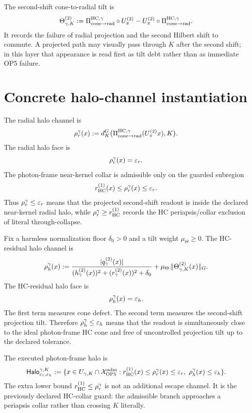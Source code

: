 \begin{definition}
The second-shift cone-to-radial tilt is
\[
\Theta_{\gamma,K}^{(2)}
:=
\Pi_{\mathrm{cone}\to\mathrm{rad}}^{\mathrm{HC},\gamma}\circ U_{\pi}^{(2)}-U_{\pi}^{(2)}\circ\Pi_{\mathrm{cone}\to\mathrm{rad}}^{\mathrm{HC},\gamma}.
\]
It records the failure of radial projection and the second Hilbert shift to commute. A projected path may visually pass through \(K\) after the second shift; in this layer that appearance is read first as tilt debt rather than as immediate OP5 failure.
\end{definition}

\section{Concrete halo-channel instantiation}

\begin{definition}
The radial halo channel is
\[
\rho_{r}^{\gamma}(x)
:=
 d_K^G\bigl(\Pi_{\mathrm{cone}\to\mathrm{rad}}^{\mathrm{HC},\gamma}(U_{\pi}^{(2)} x),K\bigr).
\]
The radial halo face is
\[
\rho_{r}^{\gamma}(x)=\varepsilon_r.
\]
The photon-frame near-kernel collar is admissible only on the guarded subregion
\[
r_{\mathrm{HC}}^{(1)}(x)\le \rho_{r}^{\gamma}(x)\le \varepsilon_r.
\]
Thus \(\rho_{r}^{\gamma}\le \varepsilon_r\) means that the projected second-shift readout is inside the declared near-kernel radial halo, while \(\rho_{r}^{\gamma}\ge r_{\mathrm{HC}}^{(1)}\) records the HC periapsis/collar exclusion of literal through-collapse.
\end{definition}

\begin{definition}
Fix a harmless normalization floor \(\delta_0>0\) and a tilt weight \(\mu_{\Theta}\ge0\). The HC-residual halo channel is
\[
\rho_{h}^{\gamma}(x)
:=
\frac{|q_{\gamma}^{(2)}(x)|}{(h_{\gamma}^{(2)}(x))^2+(r_{\gamma}^{(2)}(x))^2+\delta_0}
+
\mu_{\Theta}\,\|\Theta_{\gamma,K}^{(2)}(x)\|_{G}.
\]
The HC-residual halo face is
\[
\rho_{h}^{\gamma}(x)=\varepsilon_h.
\]
The first term measures cone defect. The second term measures the second-shift projection tilt. Therefore \(\rho_{h}^{\gamma}\le\varepsilon_h\) means that the readout is simultaneously close to the ideal photon-frame HC cone and free of uncontrolled projection tilt up to the declared tolerance.
\end{definition}

\begin{definition}
The executed photon-frame halo is
\[
\mathsf{Halo}_{\varepsilon_r,\varepsilon_h}^{\gamma,K}
:=
\{x\in U_{\gamma,K}\cap \mathcal X_{\mathrm{OP} 5}^{\mathrm{adm}}:
r_{\mathrm{HC}}^{(1)}(x)\le \rho_{r}^{\gamma}(x)\le\varepsilon_r,
\ \rho_{h}^{\gamma}(x)\le\varepsilon_h\}.
\]
The extra lower bound \(r_{\mathrm{HC}}^{(1)}\le\rho_{r}^{\gamma}\) is not an additional escape channel. It is the previously declared HC-collar guard: the admissible branch approaches a periapsis collar rather than crossing \(K\) literally.
\end{definition}


